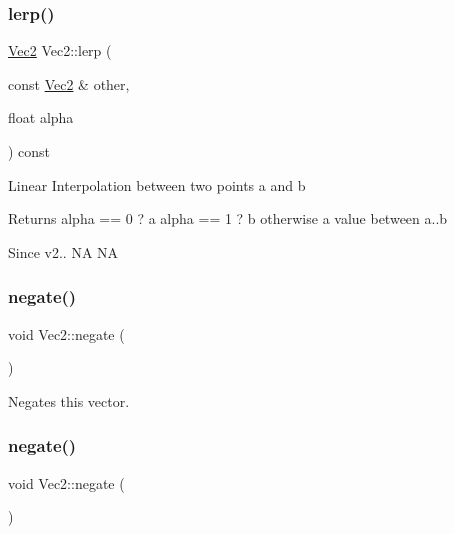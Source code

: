 \subsubsection{\texorpdfstring{lerp()}{lerp()}\hspace{0.1cm}{\footnotesize\ttfamily [2/2]}}
{\footnotesize\ttfamily \hyperlink{classVec2}{Vec2} Vec2\+::lerp (\begin{DoxyParamCaption}\item[{const \hyperlink{classVec2}{Vec2} \&}]{other,  }\item[{float}]{alpha }\end{DoxyParamCaption}) const\hspace{0.3cm}{\ttfamily [inline]}}

Linear Interpolation between two points a and b \begin{DoxyReturn}{Returns}
alpha == 0 ? a alpha == 1 ? b otherwise a value between a..b 
\end{DoxyReturn}
\begin{DoxySince}{Since}
v2..  NA  NA 
\end{DoxySince}
\mbox{\label{classVec2_a26074525e995a2085bd63d9a146f2e33}} 
\subsubsection{\texorpdfstring{negate()}{negate()}\hspace{0.1cm}{\footnotesize\ttfamily [1/2]}}
{\footnotesize\ttfamily void Vec2\+::negate (\begin{DoxyParamCaption}{ }\end{DoxyParamCaption})\hspace{0.3cm}{\ttfamily [inline]}}

Negates this vector. \mbox{\label{classVec2_a26074525e995a2085bd63d9a146f2e33}} 
\subsubsection{\texorpdfstring{negate()}{negate()}\hspace{0.1cm}{\footnotesize\ttfamily [2/2]}}
{\footnotesize\ttfamily void Vec2\+::negate (\begin{DoxyParamCaption}{ }\end{DoxyParamCaption})\hspace{0.3cm}{\ttfamily [inline]}}


